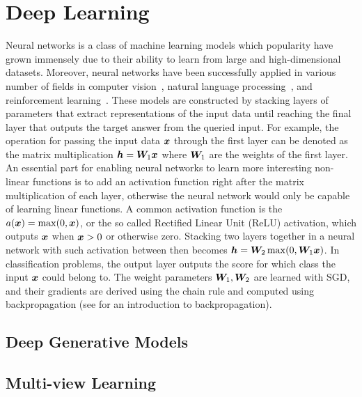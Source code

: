 \section{Deep Learning} 
\label{sec:deep_learning}

Neural networks is a class of machine learning models which popularity have grown immensely due to their ability to learn from large and high-dimensional datasets. Moreover, neural networks have been successfully applied in various number of fields in computer vision~\cite{he2016deep, krizhevsky2012imagenet}, natural language processing~\cite{devlin2018bert}, and reinforcement learning~\cite{mnih2015human, silver2016mastering}. These models are constructed by stacking layers of parameters that extract representations of the input data until reaching the final layer that outputs the target answer from the queried input. For example, the operation for passing the input data ${\bm{x}}$ through the first layer can be denoted as the matrix multiplication ${\bm{h}} = {\bm{W}}_1{\bm{x}}$ where ${\bm{W}}_1$ are the weights of the first layer. An essential part for enabling neural networks to learn more interesting non-linear functions is to add an activation function right after the matrix multiplication of each layer, otherwise the neural network would only be capable of learning linear functions. A common activation function is the $a({\bm{x}}) = \max(0, {\bm{x}})$, or the so called Rectified Linear Unit (ReLU) activation, which outputs ${\bm{x}}$ when ${\bm{x}} > 0$ or otherwise zero. Stacking two layers together in a neural network with such activation between then becomes ${\bm{h}} = {\bm{W}}_2\max(0,  {\bm{W}}_1{\bm{x}})$. In classification problems, the output layer outputs the score for which class the input ${\bm{x}}$ could belong to. The weight parameters ${\bm{W}}_1, {\bm{W}}_2$ are learned with SGD, and their gradients are derived using the chain rule and computed using backpropagation (see \cite{goodfellow2016deep} for an introduction to backpropagation).  

\subsection{Deep Generative Models}
\label{sec:deep_generative_models}




\subsection{Multi-view Learning}
